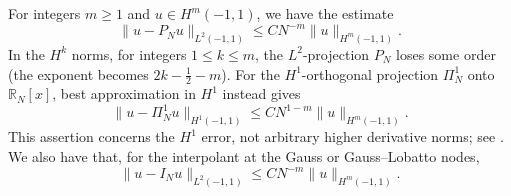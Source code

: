 For integers $m\ge1$ and $u\in H^m(-1,1)$, we have the estimate
\begin{equation*}
    \|u - P_N u\|_{L^2(-1,1)} \le C N^{-m} \|u \|_{H^m (-1,1)}.
\end{equation*}
In the $H^k$ norms, for integers $1\le k\le m$, the $L^2$-projection $P_N$ loses some order (the exponent becomes $2k-\frac12-m$). For the $H^1$-orthogonal projection $\Pi_N^1$ onto $\mathbb R_N[x]$, best approximation in $H^1$ instead gives
\begin{equation*}
    \|u-\Pi_N^1u\|_{H^1(-1,1)}\le C N^{1-m}\|u\|_{H^m(-1,1)}.
\end{equation*}
This assertion concerns the $H^1$ error, not arbitrary higher derivative norms; see \cite[Section 5.4]{CanutoHussainiQuarteroniZang2011}.
We also have that, for the interpolant at the Gauss or Gauss--Lobatto nodes,
\begin{equation*}
    \|u - I_N u \|_{L^2(-1,1)} \le C N^{-m} \|u \|_{H^m (-1,1)}.
\end{equation*}

